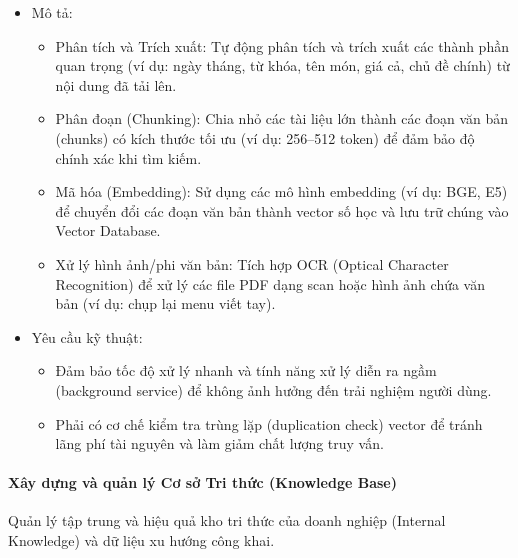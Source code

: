 \begin{itemize}
\item
  Mô tả:

  \begin{itemize}
  \item
    Phân tích và Trích xuất: Tự động phân tích và trích xuất các thành
    phần quan trọng (ví dụ: ngày tháng, từ khóa, tên món, giá cả, chủ đề
    chính) từ nội dung đã tải lên.
  \item
    Phân đoạn (Chunking): Chia nhỏ các tài liệu lớn thành các đoạn văn
    bản (chunks) có kích thước tối ưu (ví dụ: 256--512 token) để đảm bảo
    độ chính xác khi tìm kiếm.
  \item
    Mã hóa (Embedding): Sử dụng các mô hình embedding (ví dụ: BGE, E5)
    để chuyển đổi các đoạn văn bản thành vector số học và lưu trữ chúng
    vào Vector Database.
  \item
    Xử lý hình ảnh/phi văn bản: Tích hợp OCR (Optical Character
    Recognition) để xử lý các file PDF dạng scan hoặc hình ảnh chứa văn
    bản (ví dụ: chụp lại menu viết tay).
  \end{itemize}
\item
  Yêu cầu kỹ thuật:

  \begin{itemize}
  \item
    Đảm bảo tốc độ xử lý nhanh và tính năng xử lý diễn ra ngầm
    (background service) để không ảnh hưởng đến trải nghiệm người dùng.
  \item
    Phải có cơ chế kiểm tra trùng lặp (duplication check) vector để
    tránh lãng phí tài nguyên và làm giảm chất lượng truy vấn.
  \end{itemize}
\end{itemize}

\paragraph{Xây dựng và quản lý Cơ sở Tri thức (Knowledge
Base)}\label{xuxe2y-dux1ef1ng-vuxe0-quux1ea3n-luxfd-cux1a1-sux1edf-tri-thux1ee9c-knowledge-base}

Quản lý tập trung và hiệu quả kho tri thức của doanh nghiệp (Internal
Knowledge) và dữ liệu xu hướng công khai.

